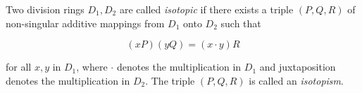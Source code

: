 Two division rings $D_1, D_2$ are called {\em isotopic} if there exists a triple $(P, Q, R)$ of non-singular additive mappings from $D_1$ onto $D_2$ such that

$$(xP)(yQ) = (x \cdot y)R$$

for all $x, y$ in $D_1$, where $\cdot$ denotes the multiplication in $D_1$ and juxtaposition denotes the multiplication in $D_2$. The triple $(P, Q, R)$ is called an {\em isotopism}.
